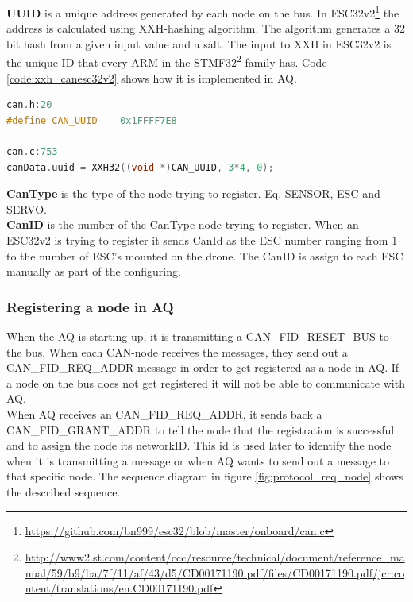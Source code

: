 \textbf{UUID} is a unique address generated by each node on the bus. In ESC32v2\footnote{\url{https://github.com/bn999/esc32/blob/master/onboard/can.c}} the address is calculated using XXH-hashing algorithm. The algorithm generates a 32 bit hash from a given input value and a salt.
The input to XXH in ESC32v2 is the unique ID that every ARM in the STMF32\footnote{\url{http://www2.st.com/content/ccc/resource/technical/document/reference_manual/59/b9/ba/7f/11/af/43/d5/CD00171190.pdf/files/CD00171190.pdf/jcr:content/translations/en.CD00171190.pdf}}
 family has. Code \ref{code:xxh_canesc32v2} shows how it is implemented in AQ.

\begin{lstlisting}[language = c, caption = Snippet showing UUID generated in ESC32v2, label=code:xxh_canesc32v2]
can.h:20
#define CAN_UUID	0x1FFFF7E8

can.c:753
canData.uuid = XXH32((void *)CAN_UUID, 3*4, 0);
\end{lstlisting}

\textbf{CanType} is the type of the node trying to register. Eq. SENSOR, ESC and SERVO.  \\

\textbf{CanID} is the number of the CanType node trying to register. When an ESC32v2 is trying to register it sends CanId as the ESC number ranging from 1 to the number of ESC's mounted on the drone. The CanID is assign to each ESC manually as part of the configuring.

\renewcommand{\mess}[4][0]{
  \stepcounter{seqlevel}
  \path
  (#2)+(0,-\theseqlevel*\unitfactor-0.7*\unitfactor) node (mess from) {};
  \addtocounter{seqlevel}{#1}
  \path
  (#4)+(0,-\theseqlevel*\unitfactor-0.7*\unitfactor) node (mess to) {};
  \draw[->,>=angle 60] (mess from) -- (mess to) node[midway, above]
  {#3};
}

\subsubsection*{Registering a node in AQ}\label{app:reg_aq_node}

When the AQ is starting up, it is transmitting a CAN\_FID\_RESET\_BUS to the bus.
When each CAN-node receives the messages, they send out a CAN\_FID\_REQ\_ADDR message in order to get registered as a node in AQ.
If a node on the bus does not get registered it will not be able to communicate with AQ. \\
When AQ receives an CAN\_FID\_REQ\_ADDR, it sends back a CAN\_FID\_GRANT\_ADDR to tell the node that the registration is successful and to assign the node its networkID.
This id is used later to identify the node when it is transmitting a message or when AQ wants to send out a message to that specific node.
The sequence diagram in figure \ref{fig:protocol_req_node} shows the described sequence.

